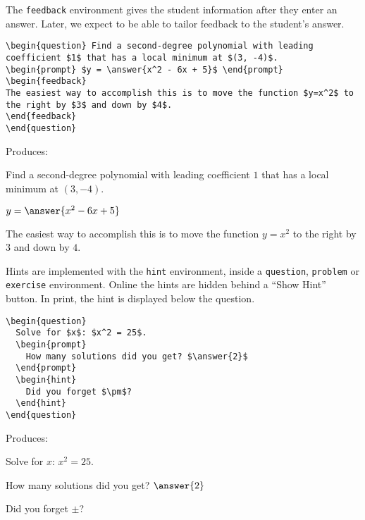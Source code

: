 \documentclass{ximera}
\begin{document}
\begin{example} The \verb!feedback! environment gives the student information after they enter an answer. Later, we expect to be able to tailor feedback to the student's answer.

\begin{verbatim}
\begin{question} Find a second-degree polynomial with leading coefficient $1$ that has a local minimum at $(3, -4)$.
\begin{prompt} $y = \answer{x^2 - 6x + 5}$ \end{prompt}
\begin{feedback}
The easiest way to accomplish this is to move the function $y=x^2$ to the right by $3$ and down by $4$.
\end{feedback}
\end{question}
\end{verbatim}

Produces:

\begin{question} Find a second-degree polynomial with leading coefficient $1$ that has a local minimum at $(3, -4)$.
\begin{prompt} $y = \answer{x^2 - 6x + 5}$ \end{prompt}
\begin{feedback}
The easiest way to accomplish this is to move the function $y=x^2$ to the right by $3$ and down by $4$.
\end{feedback}
\end{question}

\end{example}

\begin{example} 
Hints are implemented with the \verb!hint! environment, inside a \verb!question!, \verb!problem! or \verb!exercise!  environment. Online the hints are hidden behind a ``Show Hint'' button. In print, the hint is displayed below the question.

\begin{verbatim}
\begin{question}
  Solve for $x$: $x^2 = 25$. 
  \begin{prompt} 
    How many solutions did you get? $\answer{2}$ 
  \end{prompt}
  \begin{hint} 
    Did you forget $\pm$?
  \end{hint}
\end{question}
\end{verbatim}

Produces:

\begin{question}
  Solve for $x$: $x^2 = 25$. 
  \begin{prompt} 
    How many solutions did you get? $\answer{2}$ 
  \end{prompt}
  \begin{hint} 
    Did you forget $\pm$?
  \end{hint}
\end{question}

\end{example}
\end{document}
